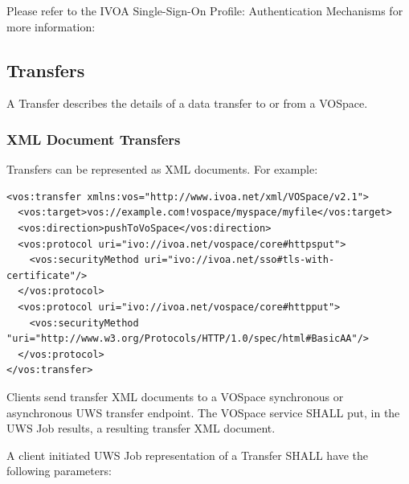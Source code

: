 \documentclass[11pt,a4paper]{ivoa}
\begin{document}
Please refer to the IVOA Single-Sign-On Profile: Authentication Mechanisms for more information: \citep{std:SSOAUTH2.0}

\subsection{Transfers}
\label{subsec:transfers}
A Transfer describes the details of a data transfer to or from a VOSpace.

\subsubsection{XML Document Transfers}
\label{subsubsec:xml document transfers}

Transfers can be represented as XML documents.  For example:

\begin{lstlisting}
<vos:transfer xmlns:vos="http://www.ivoa.net/xml/VOSpace/v2.1">
  <vos:target>vos://example.com!vospace/myspace/myfile</vos:target>
  <vos:direction>pushToVoSpace</vos:direction>
  <vos:protocol uri="ivo://ivoa.net/vospace/core#httpsput">
    <vos:securityMethod uri="ivo://ivoa.net/sso#tls-with-certificate"/>
  </vos:protocol>
  <vos:protocol uri="ivo://ivoa.net/vospace/core#httpput">
    <vos:securityMethod "uri="http://www.w3.org/Protocols/HTTP/1.0/spec/html#BasicAA"/>
  </vos:protocol>
</vos:transfer>
\end{lstlisting}

Clients send transfer XML documents to a VOSpace synchronous or asynchronous UWS transfer endpoint.  The VOSpace service SHALL put, in the UWS Job results, a resulting transfer XML document.

A client initiated UWS Job representation of a Transfer SHALL have the following parameters:
\end{document}
